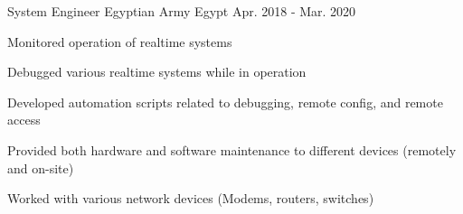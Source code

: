 

\begin{cventries}

\cventry
{System Engineer} %
{Egyptian Army} %
{Egypt} %
{Apr. 2018 - Mar. 2020} %
{
  \begin{cvitems} %
    \item {Monitored operation of realtime systems}
    \item {Debugged various realtime systems while in operation}
    \item {Developed automation scripts related to debugging, remote config, and remote access}
    \item {Provided both hardware and software maintenance to different devices (remotely and on-site)}
    \item {Worked with various network devices (Modems, routers, switches)}
  \end{cvitems}
}

\end{cventries}
